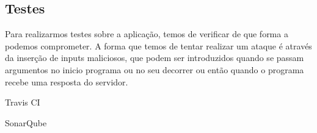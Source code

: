 \subsection{Testes}

\par Para realizarmos testes sobre a aplicação, temos de verificar de que forma a podemos comprometer. A forma que temos de tentar realizar um ataque é através da inserção de inputs maliciosos, que podem ser introduzidos quando se passam argumentos no inicio programa ou no seu decorrer ou então quando o programa recebe uma resposta do servidor.

Travis CI

SonarQube





















